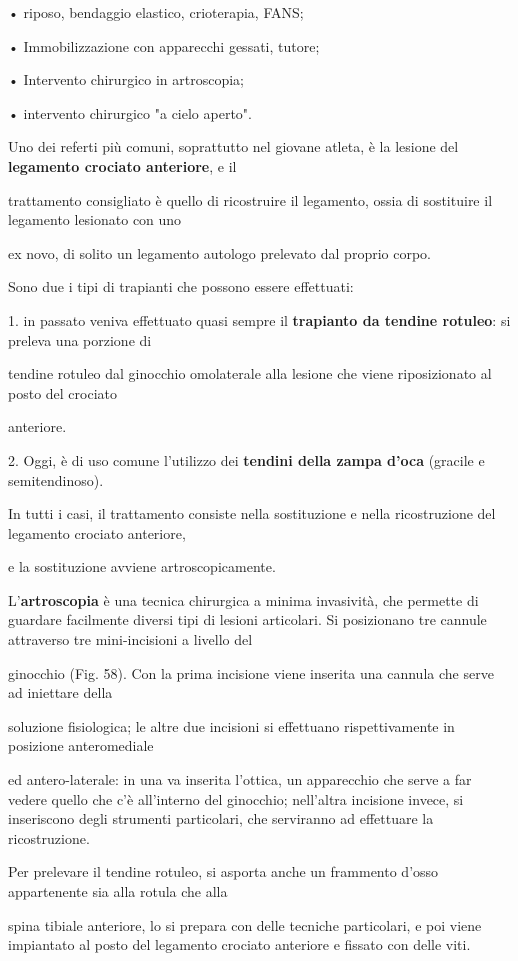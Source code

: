 \documentclass[]{article}
\begin{document}
• riposo, bendaggio elastico, crioterapia, FANS;

• Immobilizzazione con apparecchi gessati, tutore;

• Intervento chirurgico in artroscopia;

• intervento chirurgico "a cielo aperto".

Uno dei referti più comuni, soprattutto nel giovane atleta, è la lesione
del \textbf{legamento crociato anteriore}, e il

trattamento consigliato è quello di ricostruire il legamento, ossia di
sostituire il legamento lesionato con uno

ex novo, di solito un legamento autologo prelevato dal proprio corpo.

Sono due i tipi di trapianti che possono essere effettuati:

1. in passato veniva effettuato quasi sempre il \textbf{trapianto da
tendine rotuleo}: si preleva una porzione di

tendine rotuleo dal ginocchio omolaterale alla lesione che viene
riposizionato al posto del crociato

anteriore.

2. Oggi, è di uso comune l'utilizzo dei \textbf{tendini della zampa
d'oca} (gracile e semitendinoso).

In tutti i casi, il trattamento consiste nella sostituzione e nella
ricostruzione del legamento crociato anteriore,

e la sostituzione avviene artroscopicamente.

L'\textbf{artroscopia} è una tecnica chirurgica a minima invasività, che
permette di guardare facilmente diversi tipi di lesioni articolari. Si
posizionano tre cannule attraverso tre mini-incisioni a livello del

ginocchio (Fig. 58). Con la prima incisione viene inserita una cannula
che serve ad iniettare della

soluzione fisiologica; le altre due incisioni si effettuano
rispettivamente in posizione anteromediale

ed antero-laterale: in una va inserita l'ottica, un apparecchio che
serve a far vedere quello che c'è all'interno del ginocchio; nell'altra
incisione invece, si inseriscono degli strumenti particolari, che
serviranno ad effettuare la ricostruzione.

Per prelevare il tendine rotuleo, si asporta anche un frammento d'osso
appartenente sia alla rotula che alla

spina tibiale anteriore, lo si prepara con delle tecniche particolari, e
poi viene impiantato al posto del legamento crociato anteriore e fissato
con delle viti.
\end{document}
